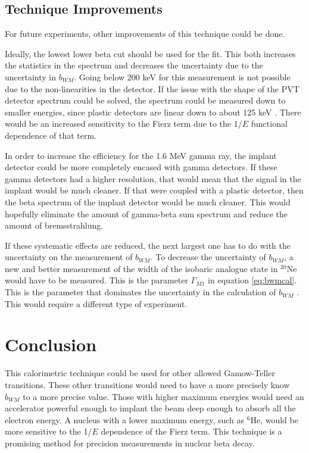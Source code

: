 \documentclass[../MaxHughesThesis.tex]{subfiles}
\begin{document}
\subsection{Technique Improvements}
For future experiments, other improvements of this technique could be done.

Ideally, the lowest lower beta cut should be used for the fit.
This both increases the statistics in the spectrum and decreases the uncertainty due to the uncertainty in $b_{WM}$.
Going below $200$ keV for this measurement is not possible due to the non-linearities in the detector.
If the issue with the shape of the PVT detector spectrum could be solved, the spectrum could be measured down to smaller energies, since plastic detectors are linear down to about 125 keV \cite{Kno10}. 
There would be an increased sensitivity to the Fierz term due to the $1/E$ functional dependence of that term.

In order to increase the efficiency for the 1.6 MeV gamma ray, the implant detector could be more completely encased with gamma detectors.
If these gamma detectors had a higher resolution, that would mean that the signal in the implant would be much cleaner.
If that were coupled with a plastic detector, then the beta spectrum of the implant detector would be much cleaner.
This would hopefully eliminate the amount of gamma-beta sum spectrum and reduce the amount of bremsstrahlung.

If these systematic effects are reduced, the next largest one has to do with the uncertainty on the measurement of $b_{WM}$.
To decrease the uncertainty of $b_{WM}$,  a new and better measurement of the width of the isobaric analogue state in $^{20}$Ne would have to be measured.
This is the parameter $\Gamma_{M1}$ in equation \ref{eq:bwmcal}.
This is the parameter that dominates the uncertainty in  the calculation of $b_{WM}$ \cite{Min11}.
This would require a different type of experiment.

\section{Conclusion}
This calorimetric technique could be used for other allowed Gamow-Teller transitions.
These other transitions would need to have a more precisely know $b_{WM}$ to a more precise value.
Those with higher maximum energies would need an accelerator powerful enough to implant the beam deep enough to absorb all the electron energy.
A nucleus with a lower maximum energy, such as $^{6}$He, would be more sensitive to the 1/$E$ dependence of the Fierz term. 
This technique is a promising method for precision measurements in nuclear beta decay.
\end{document}
